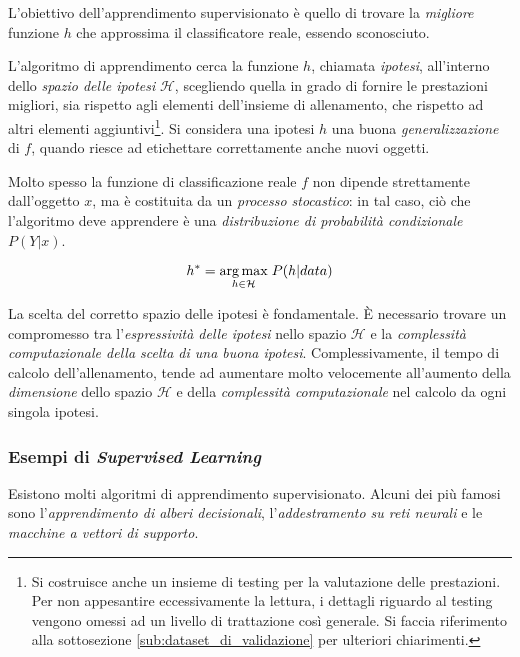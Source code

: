                 L'obiettivo dell'apprendimento supervisionato è quello di trovare la \emph{migliore} funzione $h$ che approssima il classificatore reale, essendo sconosciuto.

                L'algoritmo di apprendimento cerca la funzione $h$, chiamata \emph{ipotesi}, all'interno dello \emph{spazio delle ipotesi} $\mathcal{H}$, scegliendo quella in grado di fornire le prestazioni migliori, sia rispetto agli elementi dell'insieme di allenamento, che rispetto ad altri elementi aggiuntivi\footnote{Si costruisce anche un insieme di testing per la valutazione delle prestazioni. Per non appesantire eccessivamente la lettura, i dettagli riguardo al testing vengono omessi ad un livello di trattazione così generale. Si faccia riferimento alla sottosezione \ref{sub:dataset_di_validazione} per ulteriori chiarimenti.}.
                Si considera una ipotesi $h$ una buona \emph{generalizzazione} di $f$, quando riesce ad etichettare correttamente anche nuovi oggetti.

                Molto spesso la funzione di classificazione reale $f$ non dipende strettamente dall'oggetto $x$, ma è costituita da un \emph{processo stocastico}: in tal caso, ciò che l'algoritmo deve apprendere è una \emph{distribuzione di probabilità condizionale} $P(Y|x)$.

                \begin{equation}
                    \label{subeq:stochastic_hypotesis_choice}
                    h^* = \underset{h \in \mathcal{H}}{\operatorname{arg}\operatorname{max}}\;{P(h | data)}
                \end{equation}

                La scelta del corretto spazio delle ipotesi è fondamentale.
                È necessario trovare un compromesso tra l'\emph{espressività delle ipotesi} nello spazio $\mathcal{H}$ e la \emph{complessità computazionale della scelta di una buona ipotesi}.
                Complessivamente, il tempo di calcolo dell'allenamento, tende ad aumentare molto velocemente all'aumento della \emph{dimensione} dello spazio $\mathcal{H}$ e della \emph{complessità computazionale} nel calcolo da ogni singola ipotesi.  

            \subsubsection{Esempi di \emph{Supervised Learning}}
                Esistono molti algoritmi di apprendimento supervisionato.
                Alcuni dei più famosi sono l'\emph{apprendimento di alberi decisionali}, l'\emph{addestramento su reti neurali} e le \emph{macchine a vettori di supporto}.

